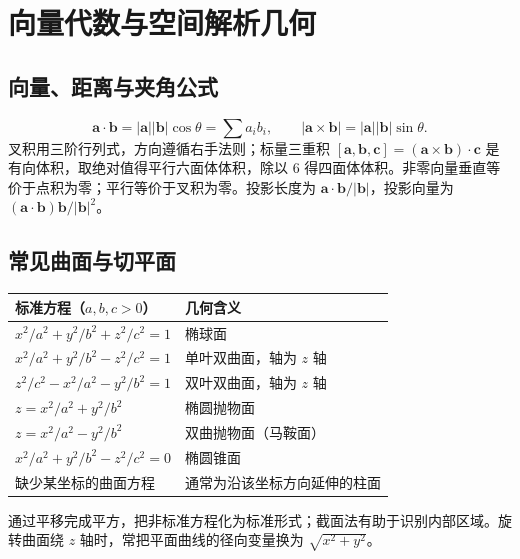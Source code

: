 \chapter{向量代数与空间解析几何}
\section{向量、距离与夹角公式}
\[
\bm a\cdot\bm b=|\bm a||\bm b|\cos\theta=\sum a_ib_i,\qquad
|\bm a\times\bm b|=|\bm a||\bm b|\sin\theta.
\]
叉积用三阶行列式，方向遵循右手法则；标量三重积 $[\bm a,\bm b,\bm c]=(\bm a\times\bm b)\cdot\bm c$ 是有向体积，取绝对值得平行六面体体积，除以 6 得四面体体积。非零向量垂直等价于点积为零；平行等价于叉积为零。投影长度为 $\bm a\cdot\bm b/|\bm b|$，投影向量为 $(\bm a\cdot\bm b)\bm b/|\bm b|^2$。


\section{常见曲面与切平面}
\begin{longtable}{p{}p{}}
\toprule 标准方程（$a,b,c>0$） & 几何含义\\\midrule\endhead
$x^2/a^2+y^2/b^2+z^2/c^2=1$ & 椭球面\\
$x^2/a^2+y^2/b^2-z^2/c^2=1$ & 单叶双曲面，轴为 $z$ 轴\\
$z^2/c^2-x^2/a^2-y^2/b^2=1$ & 双叶双曲面，轴为 $z$ 轴\\
$z=x^2/a^2+y^2/b^2$ & 椭圆抛物面\\
$z=x^2/a^2-y^2/b^2$ & 双曲抛物面（马鞍面）\\
$x^2/a^2+y^2/b^2-z^2/c^2=0$ & 椭圆锥面\\
缺少某坐标的曲面方程 & 通常为沿该坐标方向延伸的柱面\\\bottomrule
\end{longtable}
通过平移完成平方，把非标准方程化为标准形式；截面法有助于识别内部区域。旋转曲面绕 $z$ 轴时，常把平面曲线的径向变量换为 $\sqrt{x^2+y^2}$。

